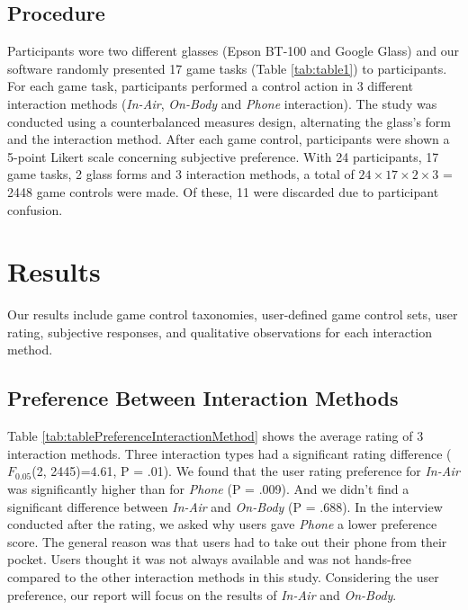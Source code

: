 \documentclass{sigchi}
\begin{document}
    \subsection {Procedure}
    Participants wore two different glasses (Epson BT-100 and Google Glass) and our software randomly presented 17 game tasks (Table \ref{tab:table1}) to participants. For each game task, participants performed a control action in 3 different interaction methods (\emph{In-Air}, \emph{On-Body} and \emph{Phone} interaction). The study was conducted using a counterbalanced measures design, alternating the glass's form and the interaction method. After each game control, participants were shown a 5-point Likert scale concerning subjective preference. With 24 participants, 17 game tasks, 2 glass forms and 3 interaction methods, a total of $24 \times 17 \times 2 \times 3$ = 2448 game controls were made. Of these, 11 were discarded due to participant confusion. 

\section{Results}

Our results include game control taxonomies, user-defined game control sets, user rating, subjective responses, and qualitative observations for each interaction method.

  \subsection{Preference Between Interaction Methods}
  Table \ref{tab:tablePreferenceInteractionMethod} shows the average rating of 3 interaction methods. Three interaction types had a significant rating difference ($F_{0.05}$(2, 2445)=4.61, P = .01). We found that the user rating preference for \emph{In-Air} was significantly higher than for \emph{Phone} (P = .009). And we didn't find a significant difference between \emph{In-Air} and \emph{On-Body} (P = .688).
  In the interview conducted after the rating, we asked why users gave \emph{Phone} a lower preference score.
  The general reason was that users had to take out their phone from their pocket. Users thought it was not always available and was not hands-free compared to the other interaction methods in this study. Considering the user preference, our report will focus on the results of \emph{In-Air} and \emph{On-Body}.
\end{document}
